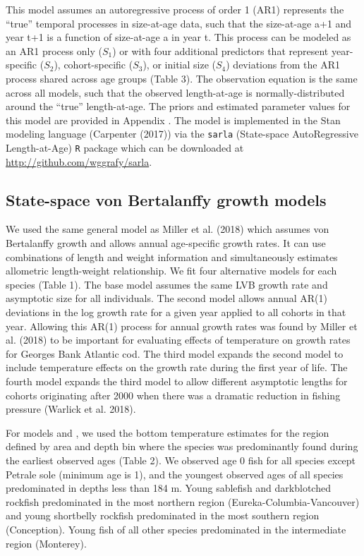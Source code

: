 \documentclass[
]{article}
\begin{document}
This model assumes an autoregressive process of order 1 (AR1) represents
the ``true'' temporal processes in size-at-age data, such that the
size-at-age a+1 and year t+1 is a function of size-at-age a in year t.
This process can be modeled as an AR1 process only (\(S_1\)) or with
four additional predictors that represent year-specific (\(S_2\)),
cohort-specific (\(S_3\)), or initial size (\(S_4\)) deviations from the
AR1 process shared across age groups (Table 3). The observation equation
is the same across all models, such that the observed length-at-age is
normally-distributed around the ``true'' length-at-age. The priors and
estimated parameter values for this model are provided in Appendix . The
model is implemented in the Stan modeling language (Carpenter (2017))
via the \texttt{sarla} (State-space AutoRegressive Length-at-Age)
\texttt{R} package which can be downloaded at
\url{http://github.com/wggrafy/sarla}.

\hypertarget{state-space-von-bertalanffy-growth-models}{%
\subsection{State-space von Bertalanffy growth
models}\label{state-space-von-bertalanffy-growth-models}}

We used the same general model as Miller et al. (2018) which assumes von
Bertalanffy growth and allows annual age-specific growth rates. It can
use combinations of length and weight information and simultaneously
estimates allometric length-weight relationship. We fit four alternative
models for each species (Table 1). The base model assumes the same LVB
growth rate and asymptotic size for all individuals. The second model
allows annual AR(1) deviations in the log growth rate for a given year
applied to all cohorts in that year. Allowing this AR(1) process for
annual growth rates was found by Miller et al. (2018) to be important
for evaluating effects of temperature on growth rates for Georges Bank
Atlantic cod. The third model expands the second model to include
temperature effects on the growth rate during the first year of life.
The fourth model expands the third model to allow different asymptotic
lengths for cohorts originating after 2000 when there was a dramatic
reduction in fishing pressure (Warlick et al. 2018).

For models and , we used the bottom temperature estimates for the region
defined by area and depth bin where the species was predominantly found
during the earliest observed ages (Table 2). We observed age 0 fish for
all species except Petrale sole (minimum age is 1), and the youngest
observed ages of all species predominated in depths less than 184 m.
Young sablefish and darkblotched rockfish predominated in the most
northern region (Eureka-Columbia-Vancouver) and young shortbelly
rockfish predominated in the most southern region (Conception). Young
fish of all other species predominated in the intermediate region
(Monterey).
\end{document}
